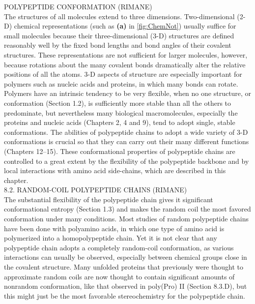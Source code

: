 POLYPEPTIDE CONFORMATION (RIMANE)\\
The structures of all molecules extend to three dimensions. Two-dimensional (2-D) chemical
representations (such as \textbf{(a)} in \ref{fig:ChemNot}) usually suffice for small molecules because their three-dimensional (3-D) structures
are defined reasonably well by the fixed bond lengths and bond angles of their covalent structures.
These representations are not sufficient for larger molecules, however, because rotations about
the many covalent bonds dramatically alter the relative positions of all the atoms. 3-D aspects of
structure are especially important for polymers such as nucleic acids and proteins, in which many
bonds can rotate. Polymers have an intrinsic tendency to be very flexible, when no one structure,
or conformation (Section 1.2), is sufficiently more stable than all the others to predominate, but
nevertheless many biological macromolecules, especially the proteins and nucleic acids (Chapters 2,
4 and 9), tend to adopt single, stable conformations.
The abilities of polypeptide chains to adopt a wide variety of 3-D conformations is crucial so that they
can carry out their many different functions (Chapters 12–15). These conformational properties of
polypeptide chains are controlled to a great extent by the flexibility of the polypeptide backbone and
by local interactions with amino acid side-chains, which are described in this chapter.
\\
8.2. RANDOM-COIL POLYPEPTIDE CHAINS (RIMANE)\\
The substantial flexibility of the polypeptide chain gives it significant conformational entropy (Section
1.3) and makes the random coil the most favored conformation under many conditions. Most studies
of random polypeptide chains have been done with polyamino acids, in which one type of amino acid
is polymerized into a homopolypeptide chain. Yet it is not clear that any polypeptide chain adopts
a completely random-coil conformation, as various interactions can usually be observed, especially
between chemical groups close in the covalent structure. Many unfolded proteins that previously were
thought to approximate random coils are now thought to contain significant amounts of nonrandom
conformation, like that observed in poly(Pro) II (Section 8.3.D), but this might just be the most
favorable stereochemistry for the polypeptide chain.
\cite{creighton2010biophysical}


